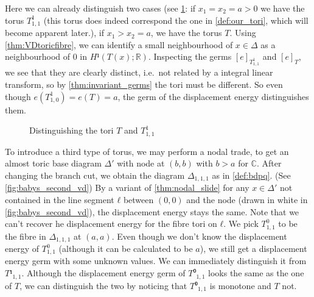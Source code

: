 \documentclass[12pt,a4paper,draft]{scrartcl}
\begin{document}
Here we can already distinguish two cases (see \cref{fig:babys_first_vd}: if $x_1=x_2=a > 0$ we have the torus $T^1_{1,1}$ (this torus does indeed correspond the one in \cref{def:our_tori}, which will become apparent later.), if $x_1>x_2=a$, we have the torus $T$.
Using \cref{thm:VDtoricfibre}, we can identify a small neighbourhood of $x ∈ Δ$ as a neighbourhood of $0$ in $H¹(T(x);ℝ)$.
Inspecting the germs $[e]_{T^1_{1,1}}$ and $[e]_{T}$, we see that they are clearly distinct, i.e.\ not related by a integral linear transform, so by \cref{thm:invariant_germs} the tori must be different.
So even though $e(T^1_{1,0}) = e(T) = a$, the germ of the displacement energy distinguishes them.

\begin{figure}
  \centering
  \caption{Distinguishing the tori $T$ and $T^1_{1,1}$}
  \label{fig:babys_first_vd}
\end{figure}

To introduce a third type of torus, we may perform a nodal trade, to get an almost toric base diagram $Δ'$ with node at $(b,b)$ with $b>a$ for $ℂ$.
After changing the branch cut, we obtain the diagram $Δ_{1,1,1}$ as in \cref{def:bdpq}. (See \cref{fig:babys_second_vd})
By a variant of \cref{thm:nodal_slide} for any $x ∈ Δ'$ not contained in the line segment $ℓ$ between $(0,0)$ and the node (drawn in white in \cref{fig:babys_second_vd}), the displacement energy stays the same.
Note that we can't recover he displacement energy for the fibre tori on $ℓ$.
We pick $T^0_{1,1}$ to be the fibre in $Δ_{1,1,1}$ at $(a,a)$.
Even though we don't know the displacement energy of $T^0_{1,1}$ (although it can be calculated to be $a$), we still get a displacement energy germ with some unknown values.
We can immediately distinguish it from $T¹_{1,1}$.
Although the displacement energy germ of $T⁰_{1,1}$ looks the same as the one of $T$, we can distinguish the two by noticing that $T⁰_{1,1}$ is monotone and $T$ not.
\end{document}
